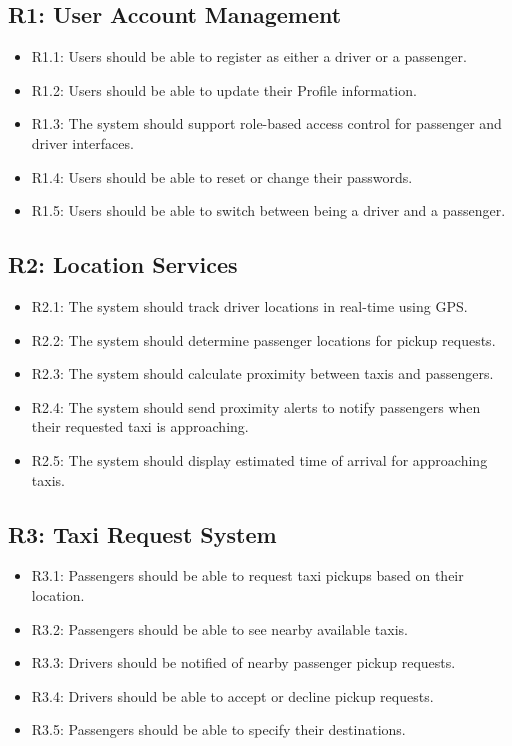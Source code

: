 \documentclass[a4paper,12pt]{article}
\begin{document}
\subsection*{R1: User Account Management}
\begin{itemize}
    \item R1.1: Users should be able to register as either a driver or a passenger.
    \item R1.2: Users should be able to update their Profile information.
    \item R1.3: The system should support role-based access control for passenger and driver interfaces.
    \item R1.4: Users should be able to reset or change their passwords.
    \item R1.5: Users should be able to switch between being a driver and a passenger.
\end{itemize}

\subsection*{R2: Location Services}
\begin{itemize}
    \item R2.1: The system should track driver locations in real-time using GPS.
    \item R2.2: The system should determine passenger locations for pickup requests.
    \item R2.3: The system should calculate proximity between taxis and passengers.
    \item R2.4: The system should send proximity alerts to notify passengers when their requested taxi is approaching.
    \item R2.5: The system should display estimated time of arrival for approaching taxis.
\end{itemize}

\subsection*{R3: Taxi Request System}
\begin{itemize}
    \item R3.1: Passengers should be able to request taxi pickups based on their location.
    \item R3.2: Passengers should be able to see nearby available taxis.
    \item R3.3: Drivers should be notified of nearby passenger pickup requests.
    \item R3.4: Drivers should be able to accept or decline pickup requests.
    \item R3.5: Passengers should be able to specify their destinations.
\end{itemize}
\end{document}
